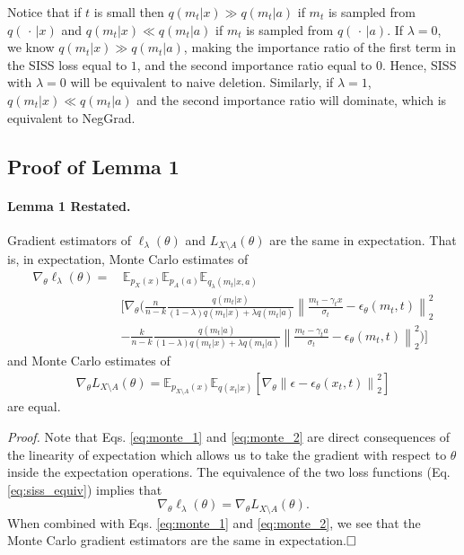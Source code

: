 \documentclass{article} \usepackage{iclr2025_conference,times}
\begin{document}
Notice that if $t$ is small then $q(m_t|x) \gg q(m_t|a)$ if $m_t$ is sampled from $q(\,\cdot\, | x)$ and $q(m_t|x) \ll q(m_t|a)$ if $m_t$ is sampled from $q(\,\cdot\, | a)$. If $\lambda=0$, we know $q(m_t|x) \gg q(m_t|a)$, making the importance ratio of the first term in the SISS loss equal to $1$, and the second importance ratio equal to $0$. Hence, SISS with $\lambda=0$ will be equivalent to naive deletion. Similarly, if $\lambda=1$, $q(m_t|x) \ll q(m_t|a)$ and the second importance ratio will dominate, which is equivalent to NegGrad.

\subsection{Proof of Lemma 1}
\label{apndx:lemma_proof}
\paragraph{Lemma 1 Restated.} Gradient estimators of $\ell_\lambda(\theta)$ and $L_{X\setminus A}(\theta)$ are the same in expectation. That is, in expectation, Monte Carlo estimates of
\begin{align}
    \nabla_\theta\ell_\lambda(\theta)=&\,\mathbb{E}_{p_X(x)} \mathbb{E}_{p_A(a)} \mathbb{E}_{q_\lambda\left(m_t| x, a\right)}\label{eq:monte_1}\\
    &\Bigg[\nabla_\theta\Bigg(\frac{n}{n-k} \frac{q\left(m_t| x\right)}{(1-\lambda) q\left(m_t| x\right)+\lambda q\left(m_t| a\right)}\left\|\frac{m_t-\gamma_t x}{\sigma_t}-\epsilon_\theta(m_t, t)\right\|_2^2 \nonumber\\
    & -\frac{k}{n-k} \frac{q\left(m_t| a\right)}{(1-\lambda) q\left(m_t| x\right)+\lambda q\left(m_t| a\right)}\left\|\frac{m_t-\gamma_t a}{\sigma_t}-\epsilon_\theta(m_t, t)\right\|_2^2\Bigg)\Bigg]\nonumber
\end{align}
and Monte Carlo estimates of 
\begin{align}
    \nabla_\theta L_{X\setminus A}(\theta)=\mathbb{E}_{p_{X\setminus A}(x)} \mathbb{E}_{q(x_t|x)}\left[\nabla_\theta\left\|\epsilon-\epsilon_\theta(x_t, t)\right\|_2^2\right]\label{eq:monte_2}
\end{align}
are equal.

\textit{Proof.} Note that Eqs. \ref{eq:monte_1} and \ref{eq:monte_2} are direct consequences of the linearity of expectation which allows us to take the gradient with respect to $\theta$ inside the expectation operations. The equivalence of the two loss functions (Eq. \ref{eq:siss_equiv}) implies that 
\begin{equation}
    \nabla_\theta\ell_\lambda(\theta)=\nabla_\theta L_{X\setminus A}(\theta).
\end{equation}
When combined with Eqs. \ref{eq:monte_1} and \ref{eq:monte_2}, we see that the Monte Carlo gradient estimators are the same in expectation.$\hfill\square$
\end{document}
